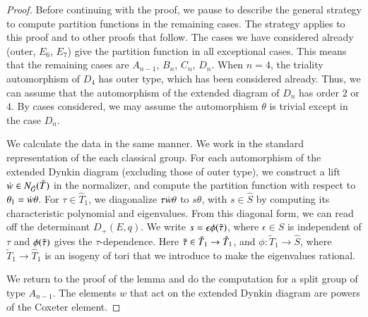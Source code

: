 \begin{proof}
Before continuing with the proof, we pause to describe the general strategy to compute partition functions in the remaining cases.
The strategy applies to this proof and to other proofs that follow.
The cases we have considered already (outer, $E_6$, $E_7$) give the partition function in all exceptional cases.
This means that the remaining cases are $A_{n-1}$, $B_n$, $C_n$, $D_n$.
When $n=4$, the triality automorphism of $D_4$ has outer type, which has been considered already.  
Thus, we can assume that the automorphism of the extended diagram of $D_n$ has order $2$ or $4$.
By cases considered, we may assume the automorphism $\theta$ is trivial except in the case $D_n$.

 We calculate the data in
the same manner.  We work in the standard  representation of the each classical group.
For each automorphism of the extended Dynkin diagram (excluding those of outer type),
we construct a lift $\dot w \in N_{\hat G}(\hat T)$ in the normalizer, and compute the partition function with respect to
 $\theta_1=\dot w \theta$.
For $\tau\in \hat T_1$, 
we diagonalize $\tau\dot w\theta$ to $s\theta$, with $s\in\hat S$ by computing its characteristic polynomial and eigenvalues.
From this diagonal form, we can read off the determinant $D_+(E,q)$.
We write $s = \epsilon \phi(\tilde\tau)$, where $\epsilon \in \hat S$ is independent of $\tau$ and $\phi(\tilde\tau)$ gives the $\tau$-dependence.
Here $\tilde\tau\in\tilde T_1\to \hat T_1$, and $\phi:\tilde T_1\to \hat S$,
where $\tilde T_1\to \hat T_1$ is an isogeny of tori that we introduce to make the eigenvalues rational.




We return to the proof of the lemma and do the computation for a split group of type $A_{n-1}$.
The elements $w$ that act on the extended Dynkin diagram are powers of the Coxeter element.


\end{proof}
